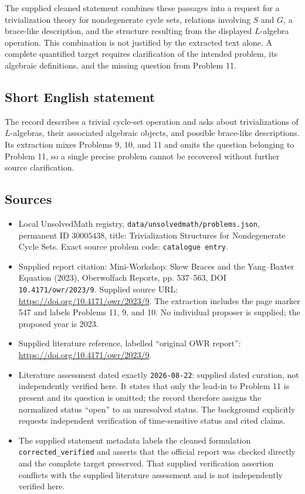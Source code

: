 \documentclass[11pt]{article}
\begin{document}
The supplied cleaned statement combines these passages into a request for a trivialization theory for nondegenerate cycle sets, relations involving \(S\) and \(G\), a brace-like description, and the structure resulting from the displayed \(L\)-algebra operation. This combination is not justified by the extracted text alone. A complete quantified target requires clarification of the intended problem, its algebraic definitions, and the missing question from Problem 11.
\subsection{Short English statement}
The record describes a trivial cycle-set operation and asks about trivializations of \(L\)-algebras, their associated algebraic objects, and possible brace-like descriptions. Its extraction mixes Problems 9, 10, and 11 and omits the question belonging to Problem 11, so a single precise problem cannot be recovered without further source clarification.
\subsection{Sources}
\begin{itemize}
\item Local UnsolvedMath registry, \texttt{data/unsolvedmath/problems.json}, permanent ID \(30005438\), title: Trivialization Structures for Nondegenerate Cycle Sets. Exact source problem code: \texttt{catalogue entry}.
\item Supplied report citation: Mini-Workshop: Skew Braces and the Yang--Baxter Equation (2023), Oberwolfach Reports, pp. 537--563, DOI \texttt{10.4171/owr/2023/9}. Supplied source URL: \url{https://doi.org/10.4171/owr/2023/9}. The extraction includes the page marker 547 and labels Problems 11, 9, and 10. No individual proposer is supplied; the proposed year is 2023.
\item Supplied literature reference, labelled ``original OWR report'': \url{https://doi.org/10.4171/owr/2023/9}.
\item Literature assessment dated exactly \texttt{2026-08-22}: supplied dated curation, not independently verified here. It states that only the lead-in to Problem 11 is present and its question is omitted; the record therefore assigns the normalized status ``open'' to an unresolved status. The background explicitly requests independent verification of time-sensitive status and cited claims.
\item The supplied statement metadata labels the cleaned formulation \texttt{corrected\_verified} and asserts that the official report was checked directly and the complete target preserved. That supplied verification assertion conflicts with the supplied literature assessment and is not independently verified here.
\end{itemize}
\end{document}
